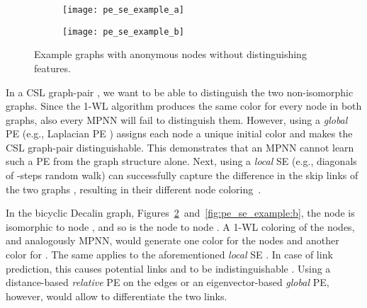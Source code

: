 \documentclass{article}
\begin{document}
\begin{wrapfigure}{r}{0.28\textwidth}
    \vspace{-6pt}
    \begin{subfigure}[t]{\linewidth}
    \centering
    \texttt{[image: pe\_se\_example\_a]}
    \label{fig:pe_se_main:a}
    \end{subfigure}
    \begin{subfigure}[t]{\linewidth}
    \centering
    \vspace{5pt}
    \texttt{[image: pe\_se\_example\_b]}
    \vspace{-2pt}
    \label{fig:pe_se_main:b}
    \end{subfigure}
\caption{Example graphs with anonymous nodes without distinguishing features.
    }\label{fig:pe_se_main}
    \vspace*{-15pt}
\end{wrapfigure}

In a CSL graph-pair \cite{murphy2019relational}, 
we want to be able to distinguish the two non-isomorphic graphs. Since the 1-WL algorithm produces the same color for every node in both graphs, also every MPNN will fail to distinguish them. However, using a \textit{global} PE (e.g., Laplacian PE \cite{dwivedi2020benchmarking}) assigns each node a unique initial color and makes the CSL graph-pair distinguishable. This demonstrates that an MPNN cannot learn such a PE from the graph structure alone. Next, using a \textit{local} SE (e.g., diagonals of -steps random walk) can successfully capture the difference in the skip links of the two graphs \cite{loukas2020graph}, resulting in their different node coloring~\cite{dwivedi2022LPE}.

In the bicyclic Decalin graph, Figures~\ref{fig:pe_se_main:b}~and~\ref{fig:pe_se_example:b}, the node  is isomorphic to node , and so is the node  to node . A \mbox{1-WL} coloring of the nodes, and analogously MPNN, would generate one color for the nodes  and another color for . The same applies to the aforementioned \textit{local} SE \cite{dwivedi2022LPE}. In case of link prediction, this causes potential links  and  to be indistinguishable \cite{zhang2021labeling}. 
Using a distance-based \textit{relative} PE on the edges or an eigenvector-based \textit{global} PE, however, would allow to differentiate the two links.
\end{document}
